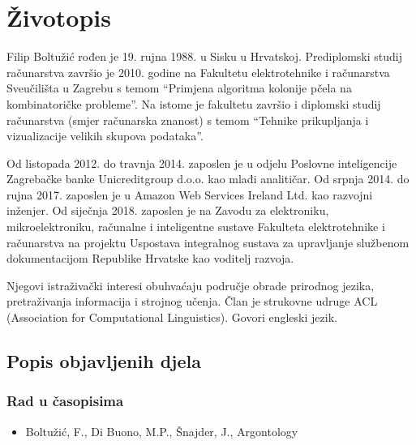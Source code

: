 \renewcommand{\leftmark}{Životopis}
\chapter*{Životopis}


Filip Boltužić rođen je 19. rujna 1988. u Sisku u Hrvatskoj. Prediplomski
studij računarstva završio je 2010. godine na Fakultetu elektrotehnike i računarstva
Sveučilišta u Zagrebu s temom ``Primjena algoritma kolonije pčela na kombinatoričke probleme''. 
Na istome je fakultetu završio i diplomski studij računarstva
(smjer računarska znanost) s temom ``Tehnike prikupljanja i vizualizacije
velikih skupova podataka''. 

Od listopada 2012. do travnja 2014. zaposlen je u odjelu Poslovne inteligencije 
Zagrebačke banke Unicreditgroup d.o.o. kao 
mlađi analitičar. Od srpnja 2014. do rujna 2017. zaposlen je 
u Amazon Web Services Ireland Ltd. kao razvojni inženjer. 
Od siječnja 2018. zaposlen je na Zavodu za elektroniku, mikroelektroniku, računalne
i inteligentne sustave Fakulteta elektrotehnike i računarstva  
na projektu Uspostava integralnog sustava za 
upravljanje službenom dokumentacijom Republike Hrvatske kao voditelj razvoja.

Njegovi istraživački interesi obuhvaćaju područje obrade prirodnog jezika,
pretraživanja informacija i strojnog učenja. 
Član je strukovne udruge ACL (Association for Computational Linguistics). 
Govori engleski jezik.

\section*{Popis objavljenih djela}

\subsection*{Rad u časopisima}


\begin{itemize}
\item Boltužić, F., Di Buono, M.P., Šnajder, J., Argontology
\end{itemize}

